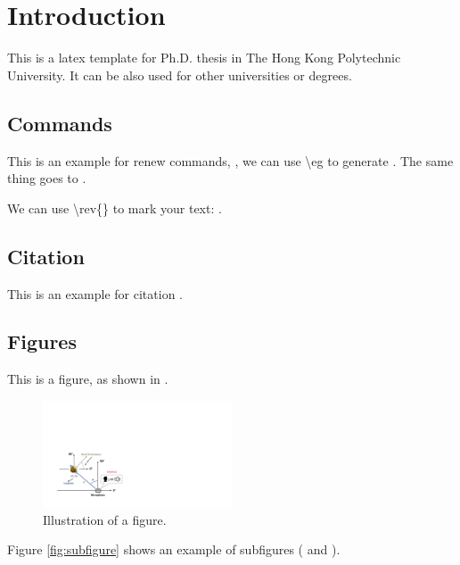 
\chapter{Introduction} \label{Chap: introduction}

This is a latex template for Ph.D. thesis in The Hong Kong Polytechnic University. It can be also used for other universities or degrees.

\section{Commands}

This is an example for renew commands, \eg, we can use \textbackslash eg to generate \eg. The same thing goes to \etc.

We can use \textbackslash rev\{\} to mark your text: . 


\section{Citation}

This is an example for citation \cite{pan2012investigation}.

\section{Figures}


This is a figure, as shown in .


 \begin{figure}[t]
     \centering
     \includegraphics[width=0.5\textwidth]{Figures/Illustration.pdf}
     \caption{Illustration of a figure.}
     \label{fig:figure}
 \end{figure}

Figure \ref{fig:subfigure} shows an example of subfigures ( and ).


